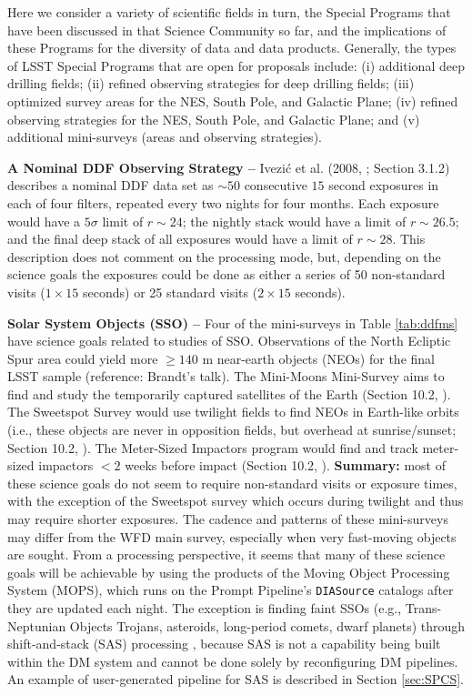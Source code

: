 \documentclass[DM,lsstdoc,toc]{lsstdoc}
\begin{document}
Here we consider a variety of scientific fields in turn, the Special Programs that have been discussed in that Science Community so far, and the implications of these Programs for the diversity of data and data products. Generally, the types of LSST Special Programs that are open for proposals include: (i) additional deep drilling fields; (ii) refined observing strategies for deep drilling fields; (iii) optimized survey areas for the NES, South Pole, and Galactic Plane; (iv) refined observing strategies for the NES, South Pole, and Galactic Plane; and (v) additional mini-surveys (areas and observing strategies).

\medskip
\noindent \textbf{A Nominal DDF Observing Strategy -- } Ivezi\'{c} et al. (2008, \citep{2008arXiv0805.2366I}; Section 3.1.2) describes a nominal DDF data set as $\sim50$ consecutive $15$ second exposures in each of four filters, repeated every two nights for four months. Each exposure would have a $5\sigma$ limit of $r\sim24$; the nightly stack would have a limit of $r\sim26.5$; and the final deep stack of all exposures would have a limit of $r\sim28$. This description does not comment on the processing mode, but, depending on the science goals the exposures could be done as either a series of 50 non-standard visits ($1\times15$ seconds) or 25 standard visits ($2\times15$ seconds). 

\medskip
\noindent \textbf{Solar System Objects (SSO) -- } Four of the mini-surveys in Table \ref{tab:ddfms} have science goals related to studies of SSO. Observations of the North Ecliptic Spur area could yield more $\geq140$ m near-earth objects (NEOs) for the final LSST sample (reference: Brandt's talk). The Mini-Moons Mini-Survey aims to find and study the temporarily captured satellites of the Earth (Section 10.2, \citep{2017arXiv170804058L}). The Sweetspot Survey would use twilight fields to find NEOs in Earth-like orbits (i.e., these objects are never in opposition fields, but overhead at sunrise/sunset; Section 10.2, \citep{2017arXiv170804058L}). The Meter-Sized Impactors program would find and track meter-sized impactors $<2$ weeks before impact (Section 10.2, \citep{2017arXiv170804058L}). {\bf Summary:} most of these science goals do not seem to require non-standard visits or exposure times, with the exception of the Sweetspot survey which occurs during twilight and thus may require shorter exposures. The cadence and patterns of these mini-surveys may differ from the WFD main survey, especially when very fast-moving objects are sought. From a processing perspective, it seems that many of these science goals will be achievable by using the products of the Moving Object Processing System (MOPS), which runs on the Prompt Pipeline's \texttt{DIASource} catalogs after they are updated each night. The exception is finding faint SSOs (e.g., Trans-Neptunian Objects Trojans, asteroids, long-period comets, dwarf planets) through shift-and-stack (SAS) processing , because SAS is not a capability being built within the DM system and cannot be done solely by reconfiguring DM pipelines. An example of user-generated pipeline for SAS is described in Section \ref{sec:SPCS}.
\end{document}
